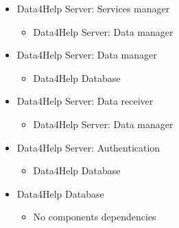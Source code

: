 \begin{itemize}
			\item{Data4Help Server: Services manager}
			\begin{itemize}\item{Data4Help Server: Data manager}\end{itemize}

			\item{Data4Help Server: Data manager}
			\begin{itemize}\item{Data4Help Database}\end{itemize}

			\item{Data4Help Server: Data receiver}
			\begin{itemize}\item{Data4Help Server: Data manager}\end{itemize}

			\item{Data4Help Server: Authentication}
			\begin{itemize}\item{Data4Help Database}\end{itemize}

			\item{Data4Help Database}
			\begin{itemize}\item{No components dependencies}\end{itemize}
			
		\end{itemize}

